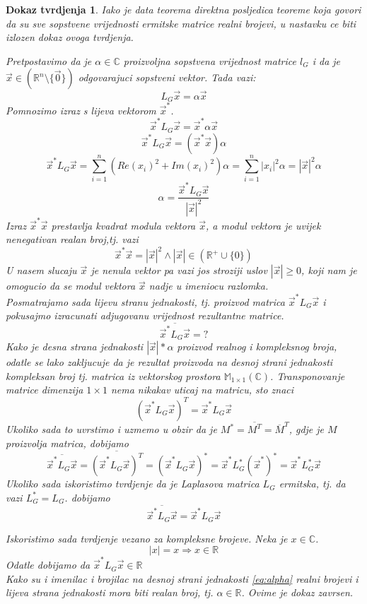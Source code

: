\documentclass[11pt]{article}
\newtheorem*{custom_proof}{Dokaz tvrdjenja}
\begin{document}
	\begin{custom_proof}
	Iako je data teorema direktna posljedica teoreme koja govori da su sve sopstvene vrijednosti ermitske matrice realni brojevi, u nastavku ce biti izlozen dokaz ovoga tvrdjenja.
	
	Pretpostavimo da je $\alpha \in \mathbb{C}$ proizvoljna sopstvena vrijednost matrice $l_G$ i da je $\vec{x} \in (\mathbb{R}^n \setminus \{\vec{0}\})$ odgovarajuci sopstveni vektor. Tada vazi:
	\[
		L_G\vec{x} = \alpha \vec{x}
	\]
	Pomnozimo izraz s lijeva vektorom $\vec{x}^*$.
	\[
		\vec{x}^*L_G\vec{x} = \vec{x}^*\alpha \vec{x}
	\]
	\[
		\vec{x}^*L_G\vec{x} = (\vec{x}^* \vec{x}) \alpha
	\]
	\[
		\vec{x}^*L_G\vec{x} = \sum_{i=1}^{n}(Re(x_i)^2 + Im(x_i)^2 ) \alpha =  \sum_{i=1}^{n}|x_i|^2 \alpha= |\vec{x}|^2 \alpha  
	\]
	\begin{equation}
		 \alpha =   \frac{\vec{x}^*L_G\vec{x}}{|\vec{x}|^2}
	\label{eq:alpha}
	\end{equation}
	Izraz $\vec{x}^* \vec{x}$ prestavlja kvadrat modula vektora $\vec{x}$, a modul vektora je uvijek nenegativan realan broj,tj. vazi
	\[
		\vec{x}^* \vec{x} = |\vec{x}|^2 \land |\vec{x}| \in (\mathbb{R}^+ \cup \{0\})  
	\]
	U nasem slucaju $\vec{x}$ je nenula vektor pa vazi jos stroziji uslov $|\vec{x}| \ge 0$, koji nam je omogucio da se modul vektora $\vec{x}$ nadje u imeniocu razlomka.  \\
	Posmatrajamo sada lijevu stranu jednakosti, tj. proizvod matrica $\vec{x}^*L_G\vec{x}$ i pokusajmo izracunati adjugovanu vrijednost rezultantne matrice.
	\[
		\overline{\vec{x}^*L_G\vec{x}} = ?
	\] 
	Kako je desna strana jednakosti $|\vec{x}| * \alpha$ proizvod realnog i kompleksnog broja, odatle se lako zakljucuje da je rezultat proizvoda na desnoj strani jednakosti kompleksan broj tj. matrica iz vektorskog prostora  $\mathbb{M}_{1 \times 1}(\mathbb{C})$. Transponovanje matrice dimenzija $1 \times 1$ nema nikakav uticaj na matricu, sto znaci
	\[
	(\vec{x}^*L_G\vec{x})^T = \vec{x}^*L_G\vec{x}
	\]
	Ukoliko sada to uvrstimo i uzmemo u obzir da je $M^*=\overline{M^T} =\overline{M}^T$, gdje je $M$ proizvolja matrica, dobijamo
	\[
		\overline{\vec{x}^*L_G\vec{x}} = \overline{(\vec{x}^*L_G\vec{x})^T} = (\vec{x}^*L_G\vec{x})^* = \vec{x}^*L_G^*(\vec{x}^*)^*= \vec{x}^*L_G^*\vec{x}
	\] 
	Ukoliko sada iskoristimo tvrdjenje da je Laplasova matrica $L_G$ ermitska, tj. da vazi $L_G^*=L_G$. dobijamo
	\[
		\overline{\vec{x}^*L_G\vec{x}} = \vec{x}^*L_G\vec{x}
	\] 
	
	Iskoristimo sada tvrdjenje vezano za kompleksne brojeve. Neka je $x \in \mathbb{C}$.
	\[
	 |x| = x \Rightarrow x \in \mathbb{R}
	\]
	Odatle dobijamo da  $\vec{x}^*L_G\vec{x} \in \mathbb{R}$ \\
	Kako su i imenilac i brojilac na desnoj strani jednakosti \ref{eq:alpha} realni brojevi i lijeva strana jednakosti mora biti realan broj, tj. $\alpha \in \mathbb{R}$. Ovime je dokaz zavrsen.
	\end{custom_proof}
	
\end{document}
